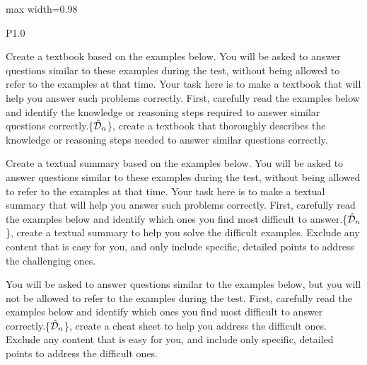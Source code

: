 \begin{table}[t]
\centering
\begin{adjustbox}{max width=0.98\textwidth}
\begin{tabular}{P{1.0\textwidth}}
    \toprule

    {Create a textbook based on the examples below. You will be asked to answer questions similar to these examples during the test, without being allowed to refer to the examples at that time. Your task here is to make a textbook that will help you answer such problems correctly. First, carefully read the examples below and identify the knowledge or reasoning steps required to answer similar questions correctly.\string\n\string\n\{$\hat{\mathcal{D}}_n$\}\string\n\string\nNow, create a textbook that thoroughly describes the knowledge or reasoning steps needed to answer similar questions correctly.} \\
    \midrule

    {Create a textual summary based on the examples below. You will be asked to answer questions similar to these examples during the test, without being allowed to refer to the examples at that time. Your task here is to make a textual summary that will help you answer such problems correctly. First, carefully read the examples below and identify which ones you find most difficult to answer.\string\n\string\n\{$\hat{\mathcal{D}}_n$\}\string\n\string\nNow, create a textual summary to help you solve the difficult examples. Exclude any content that is easy for you, and only include specific, detailed points to address the challenging ones.} \\
    \midrule

    {You will be asked to answer questions similar to the examples below, but you will not be allowed to refer to the examples during the test. First, carefully read the examples below and identify which ones you find most difficult to answer correctly.\string\n\string\n\{$\hat{\mathcal{D}}_n$\}\string\n\string\nNow, create a cheat sheet to help you address the difficult ones. Exclude any content that is easy for you, and include only specific, detailed points to address the difficult ones.} \\
    \midrule


\end{tabular}
\end{adjustbox}
\end{table}
